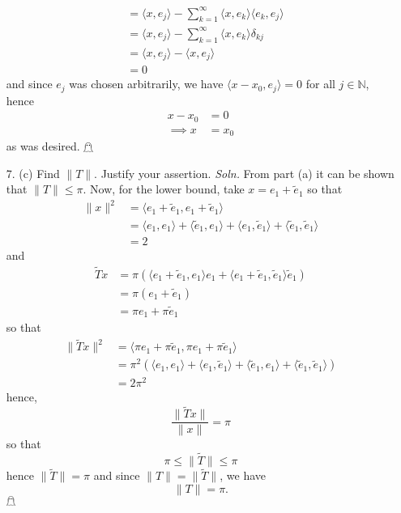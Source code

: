 \documentclass{article}
\begin{document}
\begin{itemize}
\begin{align*}
        &= \langle x, e_j\rangle - \sum_{k = 1}^{\infty} \langle x, e_k\rangle \langle e_k, e_j\rangle\\
        &= \langle x, e_j\rangle - \sum_{k = 1}^{\infty} \langle x, e_k\rangle \delta_{kj}\\
        &= \langle x, e_j\rangle - \langle x, e_j\rangle\\
        &= 0
    \end{align*}
    and since $e_j$ was chosen arbitrarily, we have $\langle x - x_0, e_j\rangle = 0$ for all $j \in \mathbb{N}$, hence 
    \begin{align*}
        x - x_0 &= 0\\
        \implies x &= x_0
    \end{align*} 
    as was desired. \hfill $\mathghost$


    \item[7.] (c) Find $\|T\|$. Justify your assertion. 
    \newline\newline
    \textit{Soln.} From part (a) it can be shown that $\|T\| \leq \pi$. Now, for the lower bound, take $x = e_1 + \tilde{e}_1$ so that
    \begin{align*}
        \|x\|^2 &= \langle e_1 + \tilde{e}_1, e_1 + \tilde{e}_1\rangle\\
        &= \langle e_1, e_1\rangle + \langle \tilde{e}_1, e_1\rangle + \langle e_1, \tilde{e}_1\rangle + \langle \tilde{e}_1, \tilde{e}_1\rangle\\
        &= 2
    \end{align*}
    and
    \begin{align*}
        \tilde{T}x &= \pi (\langle e_1 + \tilde{e}_1, e_1\rangle e_1 + \langle e_1 + \tilde{e}_1, \tilde{e}_1\rangle \tilde{e}_1)\\
        &= \pi(e_1 + \tilde{e}_1)\\
        &= \pi e_1 + \pi \tilde{e}_1
    \end{align*}
    so that
    \begin{align*}
        \|\tilde{T}x\|^2 &= \langle \pi e_1 + \pi \tilde{e}_1, \pi e_1 + \pi \tilde{e}_1\rangle\\
        &= \pi^2 (\langle e_1, e_1\rangle + \langle e_1, \tilde{e}_1 \rangle + \langle \tilde{e}_1, e_1 \rangle + \langle \tilde{e}_1, \tilde{e}_1\rangle)\\
        &= 2\pi^2
    \end{align*}
    hence,
    \[\frac{\|\tilde{T}x\|}{\|x\|} = \pi\]
    so that 
    \[\pi \leq \|\tilde{T}\| \leq \pi\]
    hence $\|\tilde{T}\| = \pi$ and since $\|T\| = \|\tilde{T}\|$, we have 
    \[\|T\| = \pi.\]
    \hfill $\mathghost$
\end{itemize}
\end{document}
